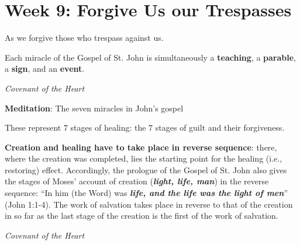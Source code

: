 \section{Week 9: Forgive Us our Trespasses}
 

As we forgive those who trespass against us.

\begin{quotationx}
Each miracle of the Gospel of St. John is simultaneously a \textbf{teaching}, a \textbf{parable}, a \textbf{sign}, and
an \textbf{event}. \begin{flushright} \emph{Covenant of the Heart}\end{flushright}

\end{quotationx}
\textbf{Meditation}: The seven miracles in John's gospel

These represent 7 stages of healing: the 7 stages of guilt and their forgiveness.

\begin{quotationx}
\textbf{Creation and healing have to take place in reverse sequence}: there, where the creation was completed, lies the
starting point for the healing (i.e., restoring) effect. Accordingly, the prologue of the Gospel of St. John also gives
the stages of Moses' account of creation (\textbf{\emph{light, life,
man}}) in the reverse sequence: “In him (the Word) was \textbf{\emph{life, and the life was the
\textbf{light} of \textbf{men}}}” (John 1:1-4). The work of salvation takes place in reverse to that of the creation in
so far as the last stage of the creation is the first of the work of salvation. \begin{flushright} \emph{Covenant of the Heart}\end{flushright}

\end{quotationx}

